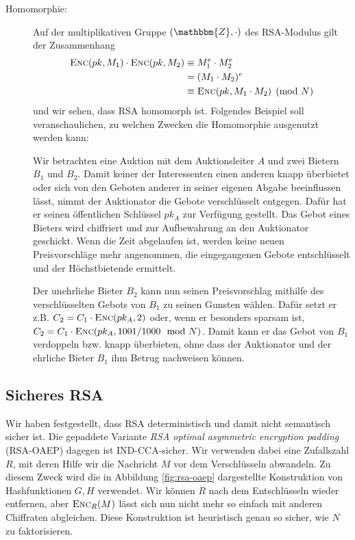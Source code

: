 \begin{description}
    \item[Homomorphie:] Auf der multiplikativen Gruppe $(\mathbbm{Z}, \cdot)$ des RSA-Modulus gilt der Zusammenhang
         \begin{equation*}
		\begin{split}
     			\textsc{Enc}(pk, M_1) \cdot \textsc{Enc}(pk, M_2) 	&\equiv M_1^e \cdot M_2^e\\
     										&= (M_1 \cdot M_2)^e\\
     										&\equiv \textsc{Enc}(pk, M_1 \cdot M_2) \pmod N
		\end{split}
     	\end{equation*}
    und wir sehen, dass RSA homomorph ist. 
    Folgendes Beispiel soll veranschaulichen, zu welchen Zwecken die Homomorphie ausgenutzt werden kann:   
    \begin{beispiel}
    	Wir betrachten eine Auktion mit dem Auktionsleiter $A$ und zwei Bietern $B_1$ und $B_2$. Damit keiner der Interessenten einen
    	anderen knapp überbietet oder sich von den Geboten anderer in seiner eigenen Abgabe beeinflussen lässt, nimmt der Auktionator die Gebote verschlüsselt entgegen. Dafür hat er seinen öffentlichen Schlüssel $pk_A$ zur Verfügung gestellt. Das Gebot eines Bieters wird chiffriert und zur Aufbewahrung an den Auktionator geschickt. Wenn die Zeit abgelaufen ist, werden keine neuen Preisvorschläge mehr angenommen, die eingegangenen Gebote entschlüsselt und der Höchstbietende ermittelt.
    
    	Der unehrliche Bieter $B_2$ kann nun seinen Preisvorschlag mithilfe des verschlüsselten Gebots von $B_1$ zu seinen Gunsten wählen. Dafür setzt er z.B. $C_2 =
    	C_1 \cdot \textsc{Enc}({pk_A, 2})$ oder, wenn er besonders sparsam ist, $C_2 = C_1 \cdot \textsc{Enc}({pk_A, 1001/1000 \mod N})$. Damit kann er das Gebot von $B_1$ verdoppeln
    	bzw. knapp überbieten, ohne dass der Auktionator und der ehrliche Bieter $B_1$ ihm Betrug nachweisen können.
    \end{beispiel}
\end{description} 

\subsection{Sicheres RSA}
Wir haben festgestellt, dass RSA deterministisch und damit nicht semantisch sicher ist. Die gepaddete Variante \emph{RSA optimal asymmetric encryption padding} (RSA-OAEP) dagegen ist IND-CCA-sicher. Wir verwenden dabei eine Zufallszahl $R$, mit deren Hilfe wir die Nachricht $M$ vor dem Verschlüsseln abwandeln. Zu diesem Zweck wird die in Abbildung \ref{fig:rsa-oaep} dargestellte Konstruktion von Hashfunktionen $G, H$ verwendet. Wir können $R$ nach dem Entschlüsseln wieder entfernen, aber $\textsc{Enc}_R(M)$ lässt sich nun nicht mehr so einfach mit anderen Chiffraten abgleichen.
Diese Konstruktion ist heuristisch genau so sicher, wie $N$ zu faktorisieren.


